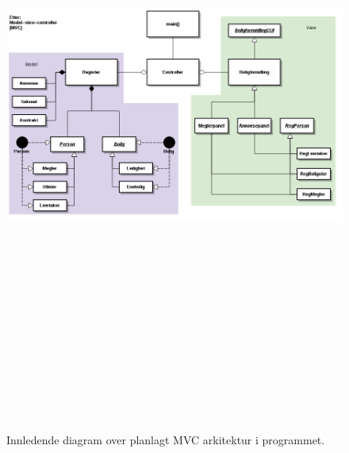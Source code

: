 \begin{figure}[ht]
\begin{center}
 \includegraphics[angle=90, height=21cm]{./img/appendix/diagram/moduler_og_relasjoner.png}
 \caption{Innledende diagram over planlagt MVC arkitektur i programmet.}
 \label{fig:mvc_innledende}
  \end{center}
\end{figure}

